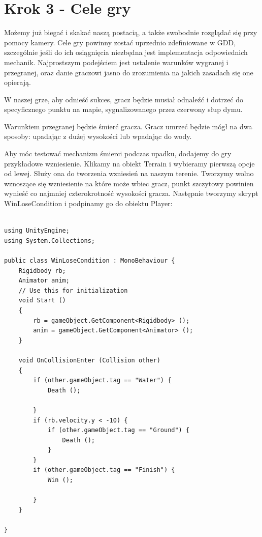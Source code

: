 \documentclass[brudnopis]{xmgr}
\begin{document}
\section{Krok 3 - Cele gry}

Możemy już biegać i skakać naszą postacią, a także swobodnie rozglądać się przy pomocy kamery. Cele gry powinny zostać uprzednio zdefiniowane w GDD, szczególnie jeśli do ich osiągnięcia niezbędna jest implementacja odpowiednich mechanik. Najprostszym podejściem jest ustalenie warunków wygranej i przegranej, oraz danie graczowi jasno do zrozumienia na jakich zasadach się one opierają.

W naszej grze, aby odnieść sukces, gracz będzie musiał odnaleźć i dotrzeć do specyficznego punktu na mapie, sygnalizowanego przez czerwony słup dymu.

Warunkiem przegranej będzie śmierć gracza. Gracz umrzeć będzie mógł na dwa sposoby: upadając z dużej wysokości lub wpadając do wody.

Aby móc testować mechanizm śmierci podczas upadku, dodajemy do gry przykładowe wzniesienie. Klikamy na obiekt Terrain i wybieramy pierwszą opcje od lewej. Służy ona do tworzenia wzniesień na naszym terenie. Tworzymy wolno wznoszące się wzniesienie na które może wbiec gracz, punkt szczytowy powinien wynieść co najmniej czterokrotność wysokości gracza. Następnie tworzymy skrypt WinLoseCondition i podpinamy go do obiektu Player:

\begin{lstlisting}

using UnityEngine;
using System.Collections;

public class WinLoseCondition : MonoBehaviour {
    Rigidbody rb;
    Animator anim;
    // Use this for initialization
    void Start ()
    {
        rb = gameObject.GetComponent<Rigidbody> ();
        anim = gameObject.GetComponent<Animator> ();
    }

    void OnCollisionEnter (Collision other)
    {
        if (other.gameObject.tag == "Water") {
            Death ();

        }
        if (rb.velocity.y < -10) {
            if (other.gameObject.tag == "Ground") {
                Death ();
            }
        }
        if (other.gameObject.tag == "Finish") {
            Win ();

        }
    } 
        
}  

\end{lstlisting}
\end{document}
